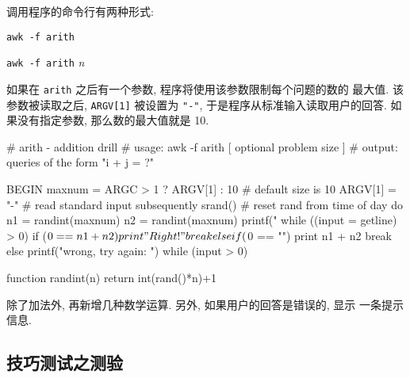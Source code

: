 调用程序的命令行有两种形式:
\begin{pattern}
    \indent\texttt{awk -f arith} \par 
    \indent\texttt{awk -f arith} \textit{n}
\end{pattern}
如果在 \texttt{arith} 之后有一个参数, 程序将使用该参数限制每个问题的数的
最大值. 该参数被读取之后, \texttt{ARGV[1]} 被设置为 \texttt{"-"},
于是程序从标准输入读取用户的回答. 如果没有指定参数, 那么数的最大值就是
10.
\begin{awkcode}
    # arith - addition drill
    #   usage:  awk -f arith [ optional problem size ]
    #   output: queries of the form "i + j = ?"

    BEGIN {
        maxnum = ARGC > 1 ? ARGV[1] : 10   # default size is 10
        ARGV[1] = "-"  # read standard input subsequently
        srand()        # reset rand from time of day
        do {
            n1 = randint(maxnum)
            n2 = randint(maxnum)
            printf("%
            while ((input = getline) > 0)
                if ($0 == n1 + n2) {
                    print "Right!"
                    break
                } else if ($0 == "") {
                    print n1 + n2
                    break
                } else
                    printf("wrong, try again: ")
        } while (input > 0)
    }

    function randint(n) { return int(rand()*n)+1 }
\end{awkcode}

\begin{exercise}
    除了加法外, 再新增几种数学运算. 另外, 如果用户的回答是错误的, 显示 
    一条提示信息.
\end{exercise}

\subsection{技巧测试之测验}
\label{subsec:skills_testing_quiz}

